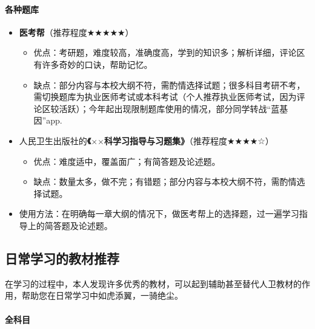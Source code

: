 \documentclass[zihao=-4,fontset=none]{Beautybook-CN}
\begin{document}
\paragraph{\textbf{各种题库}}


\begin{itemize}
	\item \textbf{医考帮}（推荐程度${\bigstar}$${\bigstar}$${\bigstar}$${\bigstar}$${\bigstar}$）
	      \begin{itemize}
	      	\item 优点：考研题，难度较高，准确度高，学到的知识多；解析详细，评论区有许多奇妙的口诀，帮助记忆。
	      	\item 缺点：部分内容与本校大纲不符，需酌情选择试题；很多科目考研不考，需切换题库为执业医师考试或本科考试（个人推荐执业医师考试，因为评论区较活跃）；今年起出现限制题库使用的情况，部分同学转战“蓝基因”app.
	      \end{itemize}
	      	      
	\item 人民卫生出版社的\textbf{《${\times}$${\times}$科学习指导与习题集》}（推荐程度${\bigstar}$${\bigstar}$${\bigstar}$${\bigstar}$☆）
	      \begin{itemize}
	      	\item 优点：难度适中，覆盖面广；有简答题及论述题。
	      	\item 缺点：数量太多，做不完；有错题；部分内容与本校大纲不符，需酌情选择试题。
	      \end{itemize}
	      	      
	\item 使用方法：在明确每一章大纲的情况下，做医考帮上的选择题，过一遍学习指导上的简答题及论述题。
\end{itemize}
\subsection{日常学习的教材推荐}

在学习的过程中，本人发现许多优秀的教材，可以起到辅助甚至替代人卫教材的作用，帮助您在日常学习中如虎添翼，一骑绝尘。

\paragraph{\textbf{全科目}}
\end{document}
